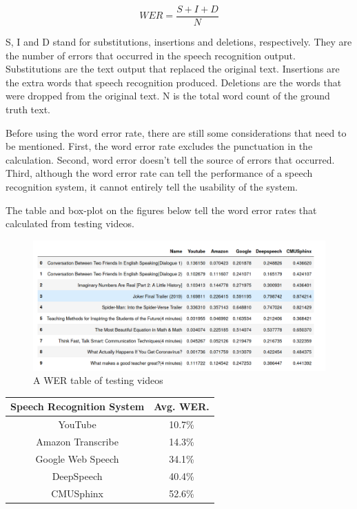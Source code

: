 \documentclass[natbib]{muthesis}
\begin{document}
 $$ WER = \frac{S+I+D}{N} $$
 
 S, I and D stand for substitutions, insertions and deletions, respectively. They are the number of errors that occurred in the speech recognition output. Substitutions are the text output that replaced the original text. Insertions are the extra words that speech recognition produced. Deletions are the words that were dropped from the original text. N is the total word count of the ground truth text.
 
 Before using the word error rate, there are still some considerations that need to be mentioned. First, the word error rate excludes the punctuation in the calculation. Second, word error doesn't tell the source of errors that occurred. Third, although the word error rate can tell the performance of a speech recognition system, it cannot entirely tell the usability of the system.
 
 
 The table and box-plot on the figures below tell the word error rates that calculated from testing videos.
 \begin{figure}[H]
 	\centering
 	\captionsetup{justification=centering}
 	\includegraphics[width=1\linewidth]{images/wer-table}
 	\caption{A WER table of testing videos}
 	\label{fig:wer-table}
 \end{figure} 
 
  \begin{center}
  	\begin{tabular}{ |c|c| } 
  		\hline
  		Speech Recognition System & Avg. WER.  \\ 
  		\hline
  		YouTube & 10.7\%\\ 
  		Amazon Transcribe & 14.3\% \\
  		Google Web Speech & 34.1\% \\
  		DeepSpeech & 40.4\% \\
  		CMUSphinx & 52.6\% \\
  		\hline
  	\end{tabular}
  \end{center}
\end{document}
